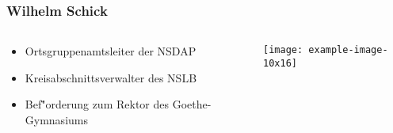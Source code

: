 \documentclass{beamer}
\date{02. Juli 2018}
\begin{document}
\beamertemplatenavigationsymbolsempty
\begin{frame}
\frametitle{Wilhelm Schick}
        \begin{columns}
            \begin{column}{.4\textwidth}
                \begin{itemize}[<+->]
            \item Ortsgruppenamtsleiter der NSDAP 
            \item Kreisabschnittsverwalter des NSLB
            \item Bef\""{o}rderung zum Rektor des Goethe-Gymnasiums
        \end{itemize} 
        \end{column}
        \begin{column}{.25\textwidth}
        \texttt{[image: example-image-10x16]}\\
    \end{column}
\end{columns}
\end{frame}
\end{document}

